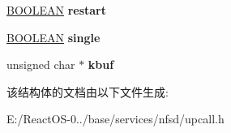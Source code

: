 \begin{DoxyCompactItemize}
\hyperlink{_processor_bind_8h_a112e3146cb38b6ee95e64d85842e380a}{B\+O\+O\+L\+E\+AN} {\bfseries restart}
\item 
\mbox{\label{struct____readdir__upcall__args_a9f520c10f749eb2d81dcc2ff6706253a}} 
\hyperlink{_processor_bind_8h_a112e3146cb38b6ee95e64d85842e380a}{B\+O\+O\+L\+E\+AN} {\bfseries single}
\item 
\mbox{\label{struct____readdir__upcall__args_a5a8f350a2730aa9dde159dc5f97c1841}} 
unsigned char $\ast$ {\bfseries kbuf}
\end{DoxyCompactItemize}


该结构体的文档由以下文件生成\+:\begin{DoxyCompactItemize}
\item 
E\+:/\+React\+O\+S-\/0../base/services/nfsd/upcall.\+h\end{DoxyCompactItemize}
